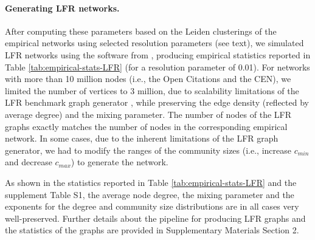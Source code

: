 \documentclass[11pt]{article}   	%
\begin{document}
\paragraph{Generating LFR networks.}
After computing these parameters based on the Leiden clusterings of the empirical networks using selected resolution parameters (see text), we simulated LFR networks using the software from \cite{lancichinetti2008benchmark}, producing empirical statistics reported in Table \ref{tab:empirical-stats-LFR} (for a resolution parameter of 0.01). For networks with more than 10 million nodes (i.e., the Open Citations and the CEN), we limited the number of vertices to 3 million, due to scalability limitations of  the LFR benchmark graph generator \citep{slota2019scalable}, while preserving the edge density (reflected by average degree) and the mixing parameter.  The number of nodes of the LFR graphs exactly matches the number of nodes in the corresponding empirical network. In some cases, due to the inherent limitations of the LFR graph generator, we had to modify the ranges of the community sizes (i.e., increase $c_{min}$ and decrease $c_{max}$) to generate the network.

As shown in the statistics reported in Table \ref{tab:empirical-stats-LFR} and the supplement  Table S1,
 the average node degree, the mixing parameter and the exponents for the degree and community size distributions are in all cases very well-preserved. Further details about the pipeline for producing LFR graphs and the statistics of the graphs are provided in Supplementary Materials Section 2.
\end{document}
